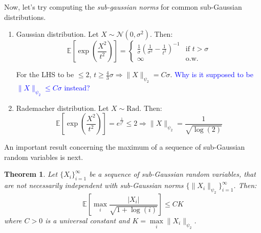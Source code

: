 \documentclass{article}
\newtheorem{theorem}{Theorem}[subsection]
\theoremstyle{remark}
\newcommand{\Exp}{\mathbb{E}}
\newcommand{\calN}{\mathcal{N}}
\newcommand{\vscomment}[1]{\textcolor{blue}{#1}}
\begin{document}
Now, let's try computing the \emph{sub-gaussian norms} for common sub-Gaussian distributions.
\begin{enumerate}
\item Gaussian distribution. Let \(X \sim \calN(0, \sigma^{2})\). Then:
\begin{equation*}
\Exp\left[\exp\left(\frac{X^{2}}{t^{2}}\right)\right] = \begin{cases} \frac{1}{\sigma}\left(\frac{1}{\sigma^{2}} - \frac{1}{t^{2}}\right)^{-1} & \text{if } t > \sigma \\ \infty & \text{o.w.} \end{cases}
\end{equation*}

For the LHS to be \(\leq 2\), \(t \geq \frac{4}{3}\sigma \Rightarrow \|X\|_{\psi_{2}} = C\sigma\). \vscomment{Why is it supposed to be \(\|X\|_{\psi_{2}} \leq C\sigma\) instead?}

\item Rademacher distribution. Let \(X \sim \mathrm{Rad}\). Then:
\begin{equation*}
\Exp\left[\exp\left(\frac{X^{2}}{t^{2}}\right)\right] = e^{\frac{1}{t^{2}}} \leq 2 \Rightarrow \|X\|_{\psi_{2}} = \frac{1}{\sqrt{\log(2)}}
\end{equation*}
\end{enumerate}

An important result concerning the maximum of a sequence of sub-Gaussian random variables is next.
\begin{theorem}
\label{thm:max-inf-sequence}
Let \(\{X_{i}\}_{i=1}^{\infty}\) be a sequence of sub-Gaussian random variables, that are not necessarily independent with sub-Gaussian norms \(\{\|X_{i}\|_{\psi_{2}}\}_{i=1}^{\infty}\). Then:
\begin{equation*}
\Exp\left[\max_{i} \frac{|X_{i}|}{\sqrt{1 + \log(i)}}\right] \leq CK
\end{equation*}
where \(C > 0\) is a universal constant and \(K = \max\limits_{i} \|X_{i}\|_{\psi_{2}}\).
\end{theorem}
\end{document}
